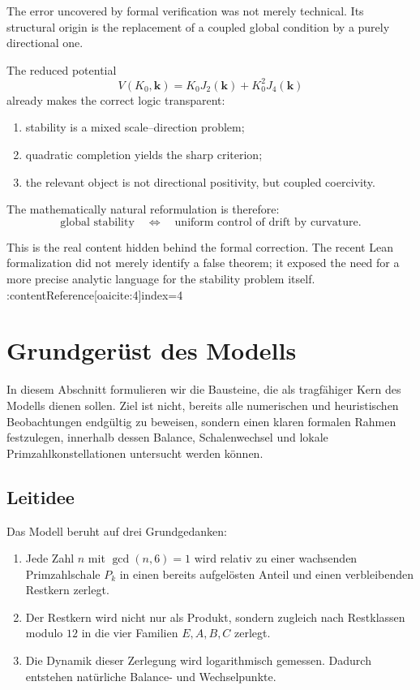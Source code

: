 \documentclass[11pt,a4paper]{article}
\newcommand{\kk}{\bm{k}}
\begin{document}
	The error uncovered by formal verification was not merely technical. Its structural origin is the replacement of a coupled global condition by a purely directional one.
	
	The reduced potential
	\[
	V(K_0,\kk)=K_0J_2(\kk)+K_0^2J_4(\kk)
	\]
	already makes the correct logic transparent:
	\begin{enumerate}
		\item stability is a mixed scale--direction problem;
		\item quadratic completion yields the sharp criterion;
		\item the relevant object is not directional positivity, but coupled coercivity.
	\end{enumerate}
	
	The mathematically natural reformulation is therefore:
	\[
	\text{global stability}
	\quad \Longleftrightarrow \quad
	\text{uniform control of drift by curvature}.
	\]
	
	This is the real content hidden behind the formal correction. The recent Lean formalization did not merely identify a false theorem; it exposed the need for a more precise analytic language for the stability problem itself. :contentReference[oaicite:4]{index=4}
	
	\section{Grundgerüst des Modells}
	
	In diesem Abschnitt formulieren wir die Bausteine, die als tragfähiger Kern des Modells dienen sollen. Ziel ist nicht, bereits alle numerischen und heuristischen Beobachtungen endgültig zu beweisen, sondern einen klaren formalen Rahmen festzulegen, innerhalb dessen Balance, Schalenwechsel und lokale Primzahlkonstellationen untersucht werden können.
	
	\subsection{Leitidee}
	
	Das Modell beruht auf drei Grundgedanken:
	
	\begin{enumerate}
		\item Jede Zahl \(n\) mit \(\gcd(n,6)=1\) wird relativ zu einer wachsenden Primzahlschale \(P_k\) in einen bereits aufgelösten Anteil und einen verbleibenden Restkern zerlegt.
		\item Der Restkern wird nicht nur als Produkt, sondern zugleich nach Restklassen modulo \(12\) in die vier Familien \(E,A,B,C\) zerlegt.
		\item Die Dynamik dieser Zerlegung wird logarithmisch gemessen. Dadurch entstehen natürliche Balance- und Wechselpunkte.
	\end{enumerate}
	
\end{document}
